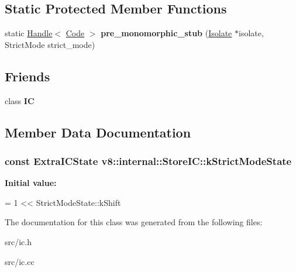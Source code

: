 \begin{DoxyCompactItemize}
\end{DoxyCompactItemize}
\subsection*{Static Protected Member Functions}
\begin{DoxyCompactItemize}
\item 
\hypertarget{classv8_1_1internal_1_1_store_i_c_af05da116d81fbc4094537e7031a90a32}{}static \hyperlink{classv8_1_1internal_1_1_handle}{Handle}$<$ \hyperlink{classv8_1_1internal_1_1_code}{Code} $>$ {\bfseries pre\+\_\+monomorphic\+\_\+stub} (\hyperlink{classv8_1_1internal_1_1_isolate}{Isolate} $\ast$isolate, Strict\+Mode strict\+\_\+mode)\label{classv8_1_1internal_1_1_store_i_c_af05da116d81fbc4094537e7031a90a32}

\end{DoxyCompactItemize}
\subsection*{Friends}
\begin{DoxyCompactItemize}
\item 
\hypertarget{classv8_1_1internal_1_1_store_i_c_ae59e849648858af1fd22081890d47b78}{}class {\bfseries I\+C}\label{classv8_1_1internal_1_1_store_i_c_ae59e849648858af1fd22081890d47b78}

\end{DoxyCompactItemize}


\subsection{Member Data Documentation}
\hypertarget{classv8_1_1internal_1_1_store_i_c_ad28e0755669a47c0582e3441bbcda954}{}
\subsubsection[{k\+Strict\+Mode\+State}]{\setlength{\rightskip}{0pt plus 5cm}const Extra\+I\+C\+State v8\+::internal\+::\+Store\+I\+C\+::k\+Strict\+Mode\+State\hspace{0.3cm}{\ttfamily [static]}}\label{classv8_1_1internal_1_1_store_i_c_ad28e0755669a47c0582e3441bbcda954}
{\bfseries Initial value\+:}
\begin{DoxyCode}
=
      1 << StrictModeState::kShift
\end{DoxyCode}


The documentation for this class was generated from the following files\+:\begin{DoxyCompactItemize}
\item 
src/ic.\+h\item 
src/ic.\+cc\end{DoxyCompactItemize}

